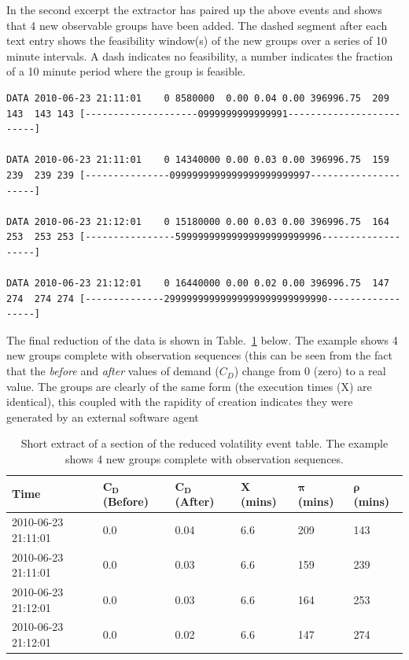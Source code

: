 
In the second excerpt the extractor has paired up the above events and shows that 4 new observable groups have been added. The dashed segment after each text entry shows the feasibility window(s) of the new groups over a series of 10 minute intervals. A dash indicates no feasibility, a number indicates the fraction of a 10 minute period where the group is feasible. 

\tiny
\begin{verbatim}
DATA 2010-06-23 21:11:01    0 8580000  0.00 0.04 0.00 396996.75  209  143  143 143 [--------------------0999999999999991-------------------------]

DATA 2010-06-23 21:11:01    0 14340000 0.00 0.03 0.00 396996.75  159  239  239 239 [---------------0999999999999999999999997---------------------]

DATA 2010-06-23 21:12:01    0 15180000 0.00 0.03 0.00 396996.75  164  253  253 253 [----------------59999999999999999999999996-------------------]

DATA 2010-06-23 21:12:01    0 16440000 0.00 0.02 0.00 396996.75  147  274  274 274 [--------------29999999999999999999999999990------------------]
\end{verbatim}
\normalsize

The final reduction of the data is shown in Table.~\ref{tab:volanal} below. The example shows 4 new groups complete with observation sequences (this can be seen from the fact that the \emph{before} and \emph{after} values of demand ($C_D$) change from 0 (zero) to a real value. The groups are clearly of the same form (the execution times (X) are identical), this coupled with the rapidity of creation indicates they were generated by an external software agent

\begin{table}[htbp]
\begin{center}
\begin{tabular}{|l|l|l|l|l|l|}
\hline
\bf{Time} &  $\mathbf{C_D}$ (Before) & $\mathbf{C_D}$ (After) & $\mathbf{X}$ (mins) & $\mathbf{\pi}$ (mins) & $\mathbf{\rho}$ (mins)   \\
\hline
2010-06-23 21:11:01  &  0.0  &  0.04  &  6.6  &  209  &  143 \\
2010-06-23 21:11:01  &  0.0  &  0.03  &  6.6  &  159  &  239 \\
2010-06-23 21:12:01  &  0.0  &  0.03  &  6.6  &  164  &  253 \\
2010-06-23 21:12:01  &  0.0  &  0.02  &  6.6  &  147  &  274 \\
\hline
\end{tabular}
\end{center}
\caption{Short extract of a section of the reduced volatility event table. The example shows 4 new groups complete with observation sequences.}
\label{tab:volanal}
\end{table}




